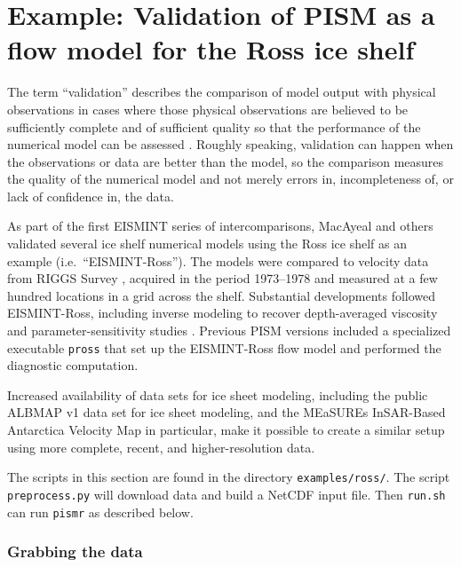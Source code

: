 
\section{Example: Validation of PISM as a flow model for the Ross ice shelf}\label{sec:ross}   

The term ``validation'' describes the comparison of model output with physical observations in cases where those physical observations are believed to be sufficiently complete and of sufficient quality so that the performance of the numerical model can be assessed \cite{Roache,Wesseling}.  Roughly speaking, validation can happen when the observations or data are better than the model, so the comparison measures the quality of the numerical model and not merely errors in, incompleteness of, or lack of confidence in, the data.

As part of the first EISMINT series of intercomparisons, MacAyeal and others \cite{MacAyealetal} validated several ice shelf numerical models using the Ross ice shelf as an example (i.e.~``EISMINT-Ross'').  The models were compared to velocity data from RIGGS Survey \cite{RIGGS2,RIGGS1}, acquired in the period 1973--1978 and measured at a few hundred locations in a grid across the shelf.  Substantial developments followed EISMINT-Ross, including inverse modeling to recover depth-averaged viscosity \cite{RommelaereMacAyeal} and parameter-sensitivity studies \cite{HumbertGreveHutter}.  Previous PISM versions included a specialized executable \texttt{pross} that set up the EISMINT-Ross flow model and performed the diagnostic computation.

Increased availability of data sets for ice sheet modeling, including the public ALBMAP v1 \cite{LeBrocqetal2010} data set for ice sheet modeling, and the MEaSUREs InSAR-Based Antarctica Velocity Map \cite{Rignotetal2011} in particular, make it possible to create a similar setup using more complete, recent, and higher-resolution data.

The scripts in this section are found in the directory \texttt{examples/ross/}.  The script \texttt{preprocess.py} will download data and build a NetCDF input file. Then \texttt{run.sh} can run \texttt{pismr} as described below.


\subsubsection*{Grabbing the data}

